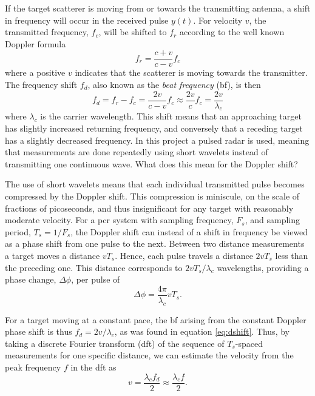 If the target scatterer is moving from or towards the transmitting antenna, a shift in frequency will occur in the received pulse $y(t)$. For velocity $v$, the transmitted frequency, $f_c$, will be shifted to $f_r$ according to the well known Doppler formula \citep{ridenour_1947}
\begin{equation}
	f_r = \frac{c + v}{c - v}f_c
\end{equation}
where a positive $v$ indicates that the scatterer is moving towards the transmitter. The frequency shift $f_d$, also known as the \emph{beat frequency} (\gls{bf}), is then
\begin{equation}\label{eq:dshift}
	f_d 
	= f_r - f_c 
	= \frac{2v}{c-v}f_c \approx \frac{2v}{c}f_c 
	= \frac{2v}{\lambda_c}
\end{equation}
where $\lambda_c$ is the carrier wavelength. This shift means that an approaching target has slightly increased returning frequency, and conversely that a receding target has a slightly decreased frequency. In this project a pulsed radar is used, meaning that measurements are done repeatedly using short wavelets instead of transmitting one continuous wave. What does this mean for the Doppler shift?

The use of short wavelets means that each individual transmitted pulse becomes compressed by the Doppler shift. This compression is miniscule, on the scale of fractions of picoseconds, and thus insignificant for any target with reasonably moderate velocity. For a \gls{pcr} system with sampling frequency, $F_s$, and sampling period, $T_s = 1/F_s$, the Doppler shift can instead of a shift in frequency be viewed as a phase shift from one pulse to the next. Between two distance measurements a target moves a distance $vT_s$. Hence, each pulse travels a distance $2vT_s$ less than the preceding one. This distance corresponds to $2vT_s/\lambda_c$ wavelengths, providing a phase change, $\Delta \phi$, per pulse of
\begin{equation}
	\Delta \phi = \frac{4\pi}{\lambda_c}vT_s.
\end{equation}

For a target moving at a constant pace, the \gls{bf} arising from the constant Doppler phase shift is thus $f_d = 2v/\lambda_c$, as was found in equation \eqref{eq:dshift}. Thus, by taking a discrete Fourier transform (\gls{dft}) of the sequence of $T_s$-spaced measurements for one specific distance, we can estimate the velocity from the peak frequency $f$ in the \gls{dft} as 
\begin{equation}\label{eq:dopp}
	v = \frac{\lambda_c f_d}{2}
	\approx \frac{\lambda_c f}{2}.
\end{equation}


